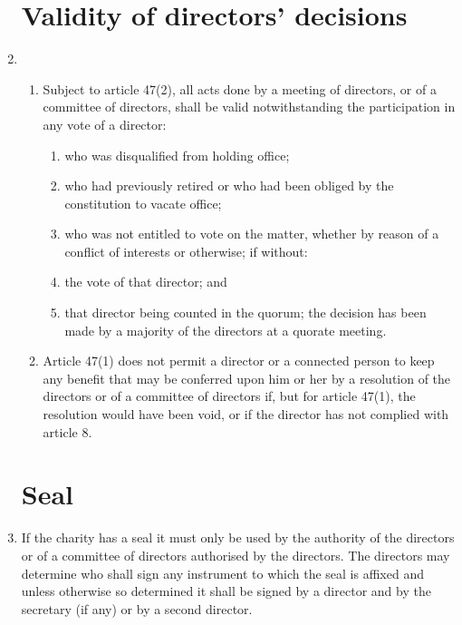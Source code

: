 \documentclass{article}
\begin{document}
\begin{enumerate}[label=\arabic*, start=23]
    \section{Validity of directors’ decisions}
    \item \begin{enumerate}[label=(\arabic*)]
        \item Subject to article 47(2), all acts done by a meeting of directors,
        or of a committee of directors, shall be valid notwithstanding
        the participation in any vote of a director:
        \begin{enumerate}[label=(\alph*)]
        \item who was disqualified from holding office;
        \item who had previously retired or who had been obliged by
        the constitution to vacate office;
        \item who was not entitled to vote on the matter, whether by
        reason of a conflict of interests or otherwise;
        if without:
        \item the vote of that director; and
        \item that director being counted in the quorum;
        the decision has been made by a majority of the directors at a
        quorate meeting.
        \end{enumerate}
        \item Article 47(1) does not permit a director or a connected person
        to keep any benefit that may be conferred upon him or her by a
        resolution of the directors or of a committee of directors if, but
        for article 47(1), the resolution would have been void, or if the
        director has not complied with article 8.
    \end{enumerate}
    
    \section{Seal}
    \item If the charity has a seal it must only be used by the authority of the
    directors or of a committee of directors authorised by the directors. The
    directors may determine who shall sign any instrument to which the
    seal is affixed and unless otherwise so determined it shall be signed by
    a director and by the secretary (if any) or by a second director.
    

\end{enumerate}
\end{document}
